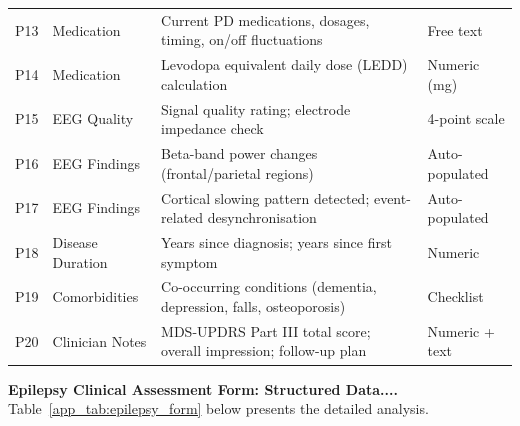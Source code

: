 {\begin{xltabular}{\textwidth}{@{} >{\raggedright\arraybackslash}p{0.5cm} >{\raggedright\arraybackslash}p{2.0cm} L p{1.4cm} @{}}
\addlinespace
P13 & Medication & Current PD medications, dosages, timing, on/off fluctuations & Free text \\
\addlinespace
P14 & Medication & Levodopa equivalent daily dose (LEDD) calculation & Numeric (mg) \\
\addlinespace
P15 & EEG Quality & Signal quality rating; electrode impedance check & 4-point scale \\
\addlinespace
P16 & EEG Findings & Beta-band power changes (frontal/parietal regions) & Auto-populated \\
\addlinespace
P17 & EEG Findings & Cortical slowing pattern detected; event-related desynchronisation & Auto-populated \\
\addlinespace
P18 & Disease Duration & Years since diagnosis; years since first symptom & Numeric \\
\addlinespace
P19 & Comorbidities & Co-occurring conditions (dementia, depression, falls, osteoporosis) & Checklist \\
\addlinespace
P20 & Clinician Notes & MDS-UPDRS Part III total score; overall impression; follow-up plan & Numeric + text \\
\end{xltabular}}

\noindent\textbf{Epilepsy Clinical Assessment Form: Structured Data....} Table~\ref{app_tab:epilepsy_form} below presents the detailed analysis.

